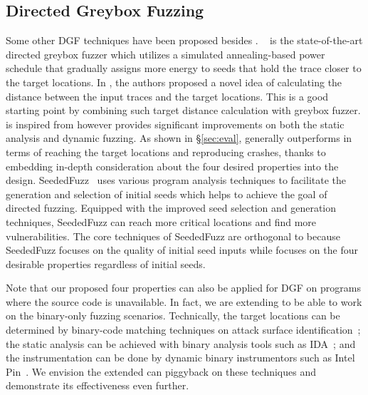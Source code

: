 \subsection{Directed Greybox Fuzzing}
Some other DGF techniques have been proposed besides \dFOT.
\aflgo~\cite{Bohme:2017:DGF} is the state-of-the-art directed greybox fuzzer which utilizes a simulated annealing-based power schedule that gradually assigns more energy to seeds that hold the trace closer to the target locations.
In \aflgo, the authors proposed a novel idea of calculating the distance between the input traces and the target locations.
This is a good starting point by combining such target distance calculation with greybox fuzzer.
\dFOT is inspired from \aflgo however provides significant improvements on both the static analysis and dynamic fuzzing.
As shown in \S\ref{sec:eval}, \dFOT generally outperforms \aflgo in terms of reaching the target locations and reproducing crashes, thanks to embedding in-depth consideration about the four desired properties into the design.
SeededFuzz~\cite{tase16:seededfuzz} uses various program analysis techniques to facilitate the generation and selection of initial seeds which helps to achieve the goal of directed fuzzing.
Equipped with the improved seed selection and generation techniques, SeededFuzz can reach more critical locations and find more vulnerabilities.
The core techniques of SeededFuzz are orthogonal to \dFOT because SeededFuzz focuses on the quality of initial seed inputs while \dFOT focuses on the four desirable properties regardless of initial seeds.

Note that our proposed four properties can also be applied for DGF on programs where the source code is unavailable. In fact, we are extending {\dFOT} to be able to work on the binary-only fuzzing scenarios. Technically, the target locations can be determined by binary-code matching techniques on attack surface identification~\cite{bingo,tse18}; the static analysis can be achieved with binary analysis tools such as IDA~\cite{ida}; and the instrumentation can be done by dynamic binary instrumentors such as Intel Pin~\cite{pin}. We envision the extended {\dFOT} can piggyback on these techniques and demonstrate its effectiveness even further.

